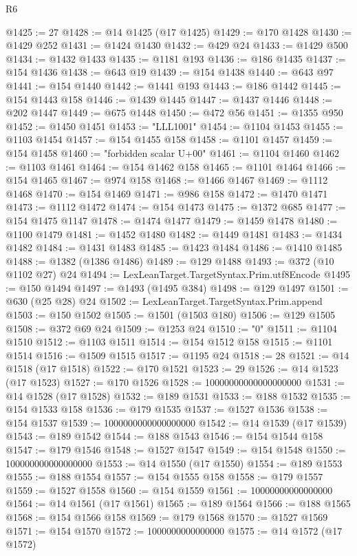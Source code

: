 \begin{lexlean}{R6}
\begin{coremodule}
{{{{{{{{{{{{{{{{{{{{{{{{{{{{{{{{{{{{{{{{{{{{{{{{{{{{{{{{{{{{{{{{{{{{{{{{@1425 := 27
@1428 := @14 @1425 (@17 @1425)
@1429 := @170 @1428
@1430 := @1429 @252
@1431 := @1424 @1430
@1432 := @429 @24
@1433 := @1429 @500
@1434 := @1432 @1433
@1435 := @1181 @193
@1436 := @186 @1435
@1437 := @154 @1436
@1438 := @643 @19
@1439 := @154 @1438
@1440 := @643 @97
@1441 := @154 @1440
@1442 := @1441 @193
@1443 := @186 @1442
@1445 := @154 @1443 @158
@1446 := @1439 @1445
@1447 := @1437 @1446
@1448 := @202 @1447
@1449 := @675 @1448
@1450 := @472 @56
@1451 := @1355 @950
@1452 := @1450 @1451
@1453 := "LLL1001"
@1454 := @1104 @1453
@1455 := @1103 @1454
@1457 := @154 @1455 @158
@1458 := @1101 @1457
@1459 := @154 @1458
@1460 := "forbidden scalar U+00"
@1461 := @1104 @1460
@1462 := @1103 @1461
@1464 := @154 @1462 @158
@1465 := @1101 @1464
@1466 := @154 @1465
@1467 := @974 @158
@1468 := @1466 @1467
@1469 := @1112 @1468
@1470 := @154 @1469
@1471 := @986 @158
@1472 := @1470 @1471
@1473 := @1112 @1472
@1474 := @154 @1473
@1475 := @1372 @685
@1477 := @154 @1475 @1147
@1478 := @1474 @1477
@1479 := @1459 @1478
@1480 := @1100 @1479
@1481 := @1452 @1480
@1482 := @1449 @1481
@1483 := @1434 @1482
@1484 := @1431 @1483
@1485 := @1423 @1484
@1486 := @1410 @1485
@1488 := @1382 (@1386 @1486)
@1489 := @129 @1488
@1493 := @372 (@10 @1102 @27) @24
@1494 := LexLeanTarget.TargetSyntax.Prim.utf8Encode
@1495 := @150 @1494
@1497 := @1493 (@1495 @384)
@1498 := @129 @1497
@1501 := @630 (@25 @28) @24
@1502 := LexLeanTarget.TargetSyntax.Prim.append
@1503 := @150 @1502
@1505 := @1501 (@1503 @180)
@1506 := @129 @1505
@1508 := @372 @69 @24
@1509 := @1253 @24
@1510 := "0"
@1511 := @1104 @1510
@1512 := @1103 @1511
@1514 := @154 @1512 @158
@1515 := @1101 @1514
@1516 := @1509 @1515
@1517 := @1195 @24
@1518 := 28
@1521 := @14 @1518 (@17 @1518)
@1522 := @170 @1521
@1523 := 29
@1526 := @14 @1523 (@17 @1523)
@1527 := @170 @1526
@1528 := 10000000000000000000
@1531 := @14 @1528 (@17 @1528)
@1532 := @189 @1531
@1533 := @188 @1532
@1535 := @154 @1533 @158
@1536 := @179 @1535
@1537 := @1527 @1536
@1538 := @154 @1537
@1539 := 1000000000000000000
@1542 := @14 @1539 (@17 @1539)
@1543 := @189 @1542
@1544 := @188 @1543
@1546 := @154 @1544 @158
@1547 := @179 @1546
@1548 := @1527 @1547
@1549 := @154 @1548
@1550 := 100000000000000000
@1553 := @14 @1550 (@17 @1550)
@1554 := @189 @1553
@1555 := @188 @1554
@1557 := @154 @1555 @158
@1558 := @179 @1557
@1559 := @1527 @1558
@1560 := @154 @1559
@1561 := 10000000000000000
@1564 := @14 @1561 (@17 @1561)
@1565 := @189 @1564
@1566 := @188 @1565
@1568 := @154 @1566 @158
@1569 := @179 @1568
@1570 := @1527 @1569
@1571 := @154 @1570
@1572 := 1000000000000000
@1575 := @14 @1572 (@17 @1572)
}}}}}}}}}}}}}}}}}}}}}}}}}}}}}}}}}}}}}}}}}}}}}}}}}}}}}}}}}}}}}}}}}}}}}}}}
\end{coremodule}
\end{lexlean}
